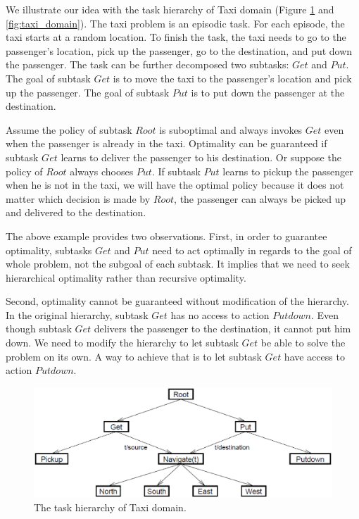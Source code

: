 We illustrate our idea with the task hierarchy of Taxi domain \cite{MaxQJ} (Figure \ref{fig:taxi} and \ref{fig:taxi_domain}).
The taxi problem is an episodic task. For each episode, the taxi starts
at a random location. To finish the task, the taxi needs to go to the passenger's location, pick up the passenger,
go to the destination, and put down the passenger. The task can be further decomposed two subtasks: $Get$ and $Put$. 
The goal of subtask $Get$ is to move the taxi to the passenger's location and pick up the passenger. The goal of 
subtask $Put$ is to put down the passenger at the destination.

Assume the policy of subtask $Root$ is suboptimal and always invokes $Get$ even when 
the passenger is already in the taxi. Optimality can be guaranteed if subtask $Get$
learns to deliver the passenger to his destination.
Or suppose the policy of $Root$ always chooses $Put$.
If subtask $Put$ learns to pickup the passenger when he is not in the taxi, 
we will have the optimal policy because it does not matter which decision is made 
by $Root$, the passenger can always be picked up and delivered to the destination.

The above example provides two observations.
First, in order to guarantee optimality, subtasks $Get$ and $Put$ need 
to act optimally in regards to the goal of whole problem, not 
the subgoal of each subtask. It implies that we need to seek hierarchical optimality
rather than recursive optimality.

Second, optimality cannot be guaranteed without modification of the hierarchy. In the original hierarchy, 
subtask $Get$ has no access to action $Putdown$. Even though subtask $Get$ delivers the passenger to the destination,
it cannot put him down. We need to modify the hierarchy to let subtask $Get$ be
able to solve the problem on its own. A way to achieve that is to let subtask $Get$ have access
to action $Putdown$. 

\begin{figure}[th]
\begin{center}
    \includegraphics[width=4.5in] {./figures/TaxiHierarchy.eps}
\end{center}
\caption{The task hierarchy of Taxi domain.}
\label{fig:taxi}
\end{figure}


